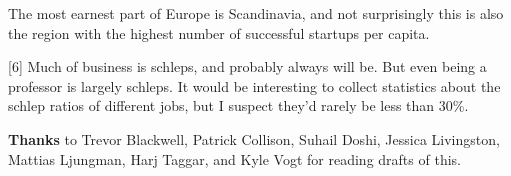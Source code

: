 The
                  most earnest part of Europe is Scandinavia, and not
                  surprisingly this is also the region with the highest number
                  of successful startups per capita.

[6] Much of business is schleps, and probably always will be.
                  But even being a professor is largely schleps. It would be
                  interesting to collect statistics about the schlep ratios of
                  different jobs, but I suspect they'd rarely be less than
                  30\%.



\textbf{Thanks} to Trevor Blackwell,
                  Patrick Collison, Suhail Doshi, Jessica Livingston, Mattias
                  Ljungman, Harj Taggar, and Kyle Vogt for reading drafts of
                  this.


              
            
          
            
              
                


                  
              
            
          
